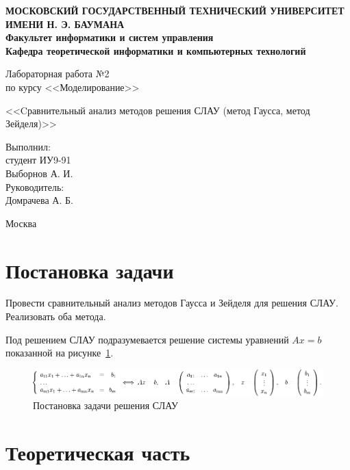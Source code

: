 \documentclass[12pt,a4paper,oneside]{extarticle}
\begin{document}
\pgfplotsset{compat=1.8}

\thispagestyle{empty}
\newpage
{
\centering


\textbf{
МОСКОВСКИЙ ГОСУДАРСТВЕННЫЙ ТЕХНИЧЕСКИЙ УНИВЕРСИТЕТ ИМЕНИ Н. Э. БАУМАНА \\
Факультет информатики и систем управления \\
Кафедра теоретической информатики и компьютерных технологий}
\bigskip
\bigskip
\bigskip
\bigskip
\bigskip
\bigskip
\bigskip

\vfill


Лабораторная работа №2 \\
по курсу <<Моделирование>>

\bigskip

{\large <<Cравнительный анализ методов решения СЛАУ (метод Гаусса, метод Зейделя)>>}
\bigskip

\vfill



\hfill\parbox{4cm} {
Выполнил:\\
студент ИУ9-91 \hfill \\
Выборнов А. И.\hfill \medskip\\
Руководитель:\\
Домрачева А. Б.\hfill
}


\vspace{\fill}

Москва \number\year
\clearpage
}



\clearpage


\section{Постановка задачи}
    Провести сравнительный анализ методов Гаусса и Зейделя для решения СЛАУ. Реализовать оба метода.

    Под решением СЛАУ подразумевается решение системы уравнений $Ax=b$ показанной на рисунке~\ref{pic:gaussian0}.
    \begin{figure}[h!]
        \centering
        \includegraphics[scale=0.5]{gaussian0.png}
        \caption{Постановка задачи решения СЛАУ}
        \label{pic:gaussian0}
    \end{figure}    
\section{Теоретическая часть}
\end{document}
